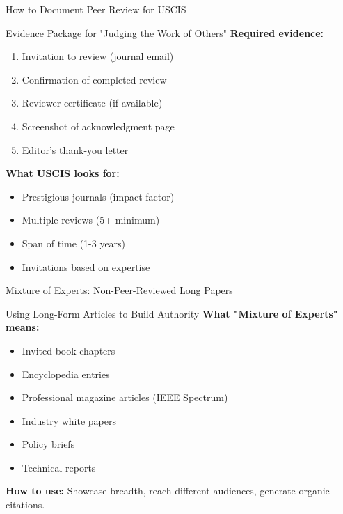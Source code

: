 \documentclass[11pt]{beamer}
\begin{document}
	\begin{frame}{How to Document Peer Review for USCIS}
		\small
		\begin{block}{Evidence Package for "Judging the Work of Others"}
			\textbf{Required evidence:}
			\begin{enumerate}
				\item Invitation to review (journal email)
				\item Confirmation of completed review
				\item Reviewer certificate (if available)
				\item Screenshot of acknowledgment page
				\item Editor's thank-you letter
			\end{enumerate}
			\textbf{What USCIS looks for:}
			\begin{itemize}
				\item Prestigious journals (impact factor)
				\item Multiple reviews (5+ minimum)
				\item Span of time (1-3 years)
				\item Invitations based on expertise
			\end{itemize}
		\end{block}
	\end{frame}
	
	\begin{frame}{Mixture of Experts: Non-Peer-Reviewed Long Papers}
		\small
		\begin{block}{Using Long-Form Articles to Build Authority}
			\textbf{What "Mixture of Experts" means:}
			\begin{itemize}
				\item Invited book chapters
				\item Encyclopedia entries
				\item Professional magazine articles (IEEE Spectrum)
				\item Industry white papers
				\item Policy briefs
				\item Technical reports
			\end{itemize}
			\textbf{How to use:} Showcase breadth, reach different audiences, generate organic citations.
		\end{block}
	\end{frame}
	
	
\end{document}
